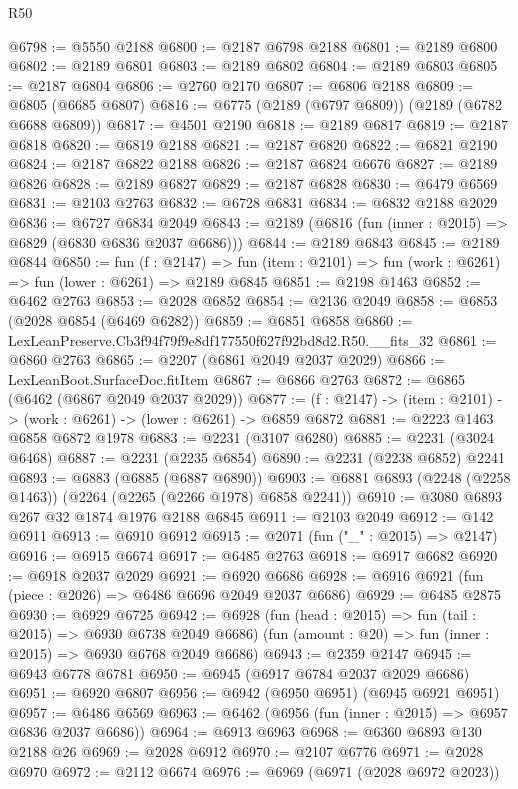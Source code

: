 \begin{lexlean}{R50}
\begin{coremodule}
@6798 := @5550 @2188
@6800 := @2187 @6798 @2188
@6801 := @2189 @6800
@6802 := @2189 @6801
@6803 := @2189 @6802
@6804 := @2189 @6803
@6805 := @2187 @6804
@6806 := @2760 @2170
@6807 := @6806 @2188
@6809 := @6805 (@6685 @6807)
@6816 := @6775 (@2189 (@6797 @6809)) (@2189 (@6782 @6688 @6809))
@6817 := @4501 @2190
@6818 := @2189 @6817
@6819 := @2187 @6818
@6820 := @6819 @2188
@6821 := @2187 @6820
@6822 := @6821 @2190
@6824 := @2187 @6822 @2188
@6826 := @2187 @6824 @6676
@6827 := @2189 @6826
@6828 := @2189 @6827
@6829 := @2187 @6828
@6830 := @6479 @6569
@6831 := @2103 @2763
@6832 := @6728 @6831
@6834 := @6832 @2188 @2029
@6836 := @6727 @6834 @2049
@6843 := @2189 (@6816 (fun (inner : @2015) => @6829 (@6830 @6836 @2037 @6686)))
@6844 := @2189 @6843
@6845 := @2189 @6844
@6850 := fun (f : @2147) =>
  fun (item : @2101) => fun (work : @6261) => fun (lower : @6261) => @2189 @6845
@6851 := @2198 @1463
@6852 := @6462 @2763
@6853 := @2028 @6852
@6854 := @2136 @2049
@6858 := @6853 (@2028 @6854 (@6469 @6282))
@6859 := @6851 @6858
@6860 := LexLeanPreserve.Cb3f94f79f9e8df177550f627f92bd8d2.R50.__fits_32
@6861 := @6860 @2763
@6865 := @2207 (@6861 @2049 @2037 @2029)
@6866 := LexLeanBoot.SurfaceDoc.fitItem
@6867 := @6866 @2763
@6872 := @6865 (@6462 (@6867 @2049 @2037 @2029))
@6877 := (f : @2147) -> (item : @2101) -> (work : @6261) -> (lower : @6261) -> @6859 @6872
@6881 := @2223 @1463 @6858 @6872 @1978
@6883 := @2231 (@3107 @6280)
@6885 := @2231 (@3024 @6468)
@6887 := @2231 (@2235 @6854)
@6890 := @2231 (@2238 @6852) @2241
@6893 := @6883 (@6885 (@6887 @6890))
@6903 := @6881 @6893 (@2248 (@2258 @1463)) (@2264 (@2265 (@2266 @1978) @6858 @2241))
@6910 := @3080 @6893 @267 @32 @1874 @1976 @2188 @6845
@6911 := @2103 @2049
@6912 := @142 @6911
@6913 := @6910 @6912
@6915 := @2071 (fun ("_" : @2015) => @2147)
@6916 := @6915 @6674
@6917 := @6485 @2763
@6918 := @6917 @6682
@6920 := @6918 @2037 @2029
@6921 := @6920 @6686
@6928 := @6916 @6921 (fun (piece : @2026) => @6486 @6696 @2049 @2037 @6686)
@6929 := @6485 @2875
@6930 := @6929 @6725
@6942 := @6928
    (fun (head : @2015) => fun (tail : @2015) => @6930 @6738 @2049 @6686)
    (fun (amount : @20) => fun (inner : @2015) => @6930 @6768 @2049 @6686)
@6943 := @2359 @2147
@6945 := @6943 @6778 @6781
@6950 := @6945 (@6917 @6784 @2037 @2029 @6686)
@6951 := @6920 @6807
@6956 := @6942 (@6950 @6951) (@6945 @6921 @6951)
@6957 := @6486 @6569
@6963 := @6462 (@6956 (fun (inner : @2015) => @6957 @6836 @2037 @6686))
@6964 := @6913 @6963
@6968 := @6360 @6893 @130 @2188 @26
@6969 := @2028 @6912
@6970 := @2107 @6776
@6971 := @2028 @6970
@6972 := @2112 @6674
@6976 := @6969 (@6971 (@2028 @6972 @2023))

\end{coremodule}
\end{lexlean}
